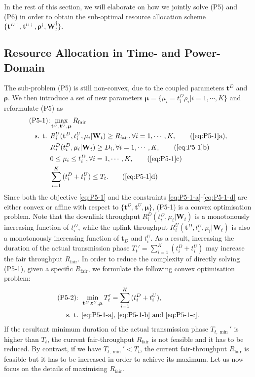 \documentclass[12pt,draftcls,onecolumn,journal]{IEEEtran}
\begin{document}
In the rest of this section, we will elaborate on how we jointly solve (P5) and (P6) in order to obtain the sub-optimal resource allocation scheme $\{\mathbf{t}^{D\dagger}, \mathbf{t}^{U\dagger}, \boldsymbol{\rho}^\dagger, \mathbf{W}_t^\dagger\}$.


\subsection{Resource Allocation in Time- and Power-Domain}

The sub-problem (P5) is still non-convex, due to the coupled parameters $\mathbf{t}^D$ and $\boldsymbol{\rho}$. We then introduce a set of new parameters $\mathbf{\mu} = \{\mu_i = t_i^D\rho_i | i=1,\cdots,K\}$ and reformulate (P5) as
\begin{align}
	\text{(P5-1):} & \max_{\mathbf{t}^D, \mathbf{t}^U, \boldsymbol{\mu}} R_{\text{fair}} \label{eq:P5-1} \\
	\text{s. t. } & R_i^U(\mathbf{t}^D,t_i^U,\mu_i | \mathbf{W}_t) \geq R_{\text{fair}}, \forall i = 1,\cdots,K, \tag{\ref{eq:P5-1}a}, \label{eq:P5-1-a}\\
	& R_i^D(t_i^D,\mu_i | \mathbf{W}_t) \geq D_i, \forall i=1,\cdots,K, \tag{\ref{eq:P5-1}b} \label{eq:P5-1-b} \\
	& 0 \leq \mu_i \leq t_i^D, \forall i=1,\cdots,K, \tag{\ref{eq:P5-1}c} \label{eq:P5-1-c} \\
	& \sum_{i=1}^{K}{(t_i^D+t_i^U)}\leq T_t. \tag{\ref{eq:P5-1}d} \label{eq:P5-1-d}
\end{align}
Since both the objective \eqref{eq:P5-1} and the constraints \eqref{eq:P5-1-a}-\eqref{eq:P5-1-d} are either convex or affine with respect to $\{\mathbf{t}^D, \mathbf{t}^U, \boldsymbol{\mu}\}$, (P5-1) is a convex optimisation problem. Note that the downlink throughput $R_i^D(t_i^D,\mu_i | \mathbf{W}_t)$ is a monotonously increasing function of $t_i^D$, while the uplink throughput $R_i^U(\mathbf{t}^D,t_i^U,\mu_i | \mathbf{W}_t)$ is also a monotonously increasing function of $\mathbf{t}_D$ and $t_i^U$. As a result, increasing the duration of the actual transmission phase $T_t' = \sum_{i=1}^{K}{(t_i^D+t_i^U)}$ may increase the fair throughput $R_{\text{fair}}$. In order to reduce the complexity of directly solving (P5-1), given a specific $R_{\text{fair}}$, we formulate the following convex optimisation problem:
\begin{align}
	\text{(P5-2): } &\min_{\mathbf{t}^D, \mathbf{t}^U, \boldsymbol{\mu}} T_t' = \sum_{i=1}^{K}{(t_i^D+t_i^U)}, \label{eq:P5-2} \\
	\text{s. t. } & \text{\eqref{eq:P5-1-a}, \eqref{eq:P5-1-b} and \eqref{eq:P5-1-c}}. \nonumber
\end{align}
If the resultant minimum duration of the actual transmission phase $T_{t,\min}'$ is higher than $T_t$, the current fair-throughput $R_{\text{fair}}$ is not feasible and it has to be reduced. By contrast, if we have $T_{t,\min}' < T_t$, the current fair-throughput $R_{\text{fair}}$ is feasible but it has to be increased in order to achieve its maximum. Let us now focus on the details of maximising $R_{\text{fair}}$.
\end{document}

